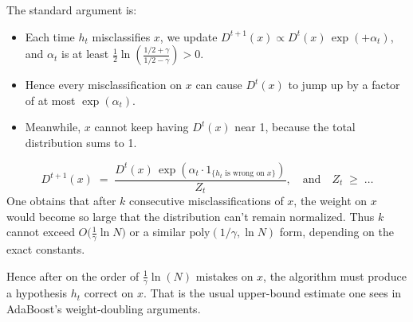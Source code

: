 \documentclass[11pt]{article}
\DeclareMathOperator{\1}{\mathbbm{1}}
\begin{document}
The standard argument is:
\begin{itemize}
	\item Each time $h_t$ misclassifies $x$, we update $D^{t+1}(x) \propto D^t(x)\,\exp(+\alpha_t)$, and $\alpha_t$ is at least $\frac12\ln(\tfrac{1/2+\gamma}{1/2-\gamma})>0$.  
	\item Hence every misclassification on $x$ can cause $D^t(x)$ to jump up by a factor of at most $\exp(\alpha_t)$.
	\item Meanwhile, $x$ cannot keep having $D^t(x)$ near 1, because the total distribution sums to 1.
\end{itemize}

\[
D^{t+1}(x)\;=\;\frac{D^t(x)\,\exp(\alpha_t\cdot 1_{\{h_t\text{ is wrong on }x\}})}{Z_t},
\quad\text{and}\quad
Z_t\;\ge\;\dots
\]
One obtains that after $k$ consecutive misclassifications of $x$, the weight on $x$ would become so large that the distribution can’t remain normalized.  Thus $k$ cannot exceed $O\!\bigl(\frac{1}{\gamma}\ln N\bigr)$ or a similar $\text{poly}(1/\gamma,\ln N)$ form, depending on the exact constants.  

Hence after on the order of $\frac{1}{\gamma}\ln(N)$ mistakes on $x$, the algorithm must produce a hypothesis $h_t$ correct on $x$.  That is the usual upper-bound estimate one sees in AdaBoost’s weight-doubling arguments.
\end{document}
